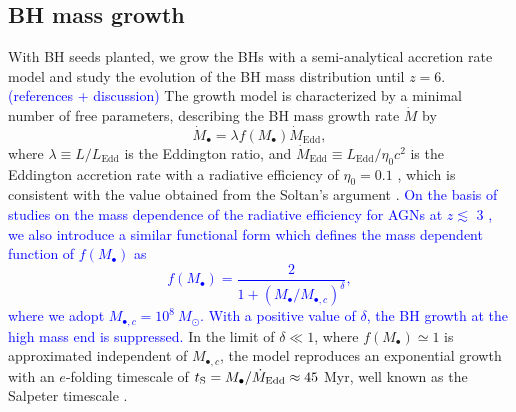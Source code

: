 \documentclass[twocolumn, twocolappendix]{aastex63}
\newcommand{\Msun}{M_\odot}
\newcommand{\Mbh}{M_\bullet}
\newcommand{\Mdot}{\dot{M}}
\newcommand{\blue}[1]{\textcolor{blue}{ #1}}
\begin{document}
\begin{CJK*}{UTF8}{gbsn}
\subsection{BH mass growth}
\label{sec:model}
With BH seeds planted, we grow the BHs with a semi-analytical accretion rate model and study the evolution of the BH mass distribution until $z=6$. 
\blue{(references + discussion)}
The growth model is characterized by a minimal number of free parameters, 
describing the BH mass growth rate $\Mdot$ by
\begin{equation}
  \label{eq:mdot}
  \Mdot_\bullet = \lambda f(\Mbh) \Mdot_\mathrm{Edd} ,
\end{equation}
where $\lambda \equiv L/L_\mathrm{Edd}$ is the Eddington ratio,
and $\Mdot_\mathrm{Edd} \equiv L_{\mathrm{Edd}}/\eta_0 c^2$ is the Eddington accretion rate with a radiative efficiency of $\eta_0=0.1$ \citep{1973A&A....24..337S},
which is consistent with the value obtained from the Soltan's argument \citep[e.g.,][]{2002MNRAS.335..965Y,2010ApJ...725..388C}.
\blue{
On the basis of studies on the mass dependence of the radiative efficiency for AGNs at $z\lesssim$ 3 
\citep{2008MNRAS.390..561C,2012ApJ...749..187L,2014ApJ...786..104U}, 
we also introduce a similar functional form which defines the mass dependent function of $f(\Mbh)$ as 
%
\begin{equation}
f(\Mbh) = \frac{2}{1+\left(\Mbh /M_{\bullet,c} \right)^\delta}, 
\end{equation}
%
where we adopt $M_{\bullet,c}=10^8~\Msun$.
With a positive value of $\delta$, the BH growth at the high mass end is suppressed.
}
In the limit of $\delta \ll 1$, where $f(\Mbh) \simeq 1$ is approximated independent of $M_{\bullet,c}$, the model reproduces an exponential growth with an $e$-folding timescale of
$t_{\rm S} =  \Mbh/\Mdot_{\mathrm{Edd}} \approx 45$ Myr, well known as the Salpeter timescale \citep{1964ApJ...140..796S}.




\end{CJK*}
\end{document}
